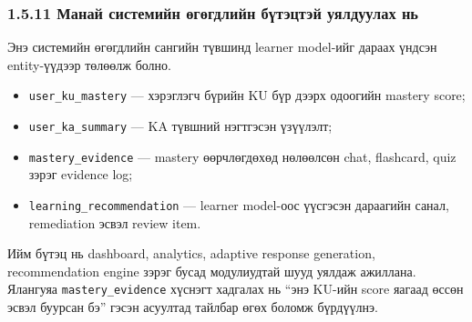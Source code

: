 \documentclass[12pt,A4]{report}
\begin{document}



\subsubsection{1.5.11 Манай системийн өгөгдлийн бүтэцтэй уялдуулах нь}

Энэ системийн өгөгдлийн сангийн түвшинд learner model-ийг дараах үндсэн entity-үүдээр төлөөлж болно.

\begin{itemize}
    \item \texttt{user\_ku\_mastery} --- хэрэглэгч бүрийн KU бүр дээрх одоогийн mastery score;
    \item \texttt{user\_ka\_summary} --- KA түвшний нэгтгэсэн үзүүлэлт;
    \item \texttt{mastery\_evidence} --- mastery өөрчлөгдөхөд нөлөөлсөн chat, flashcard, quiz зэрэг evidence log;
    \item \texttt{learning\_recommendation} --- learner model-оос үүсгэсэн дараагийн санал, remediation эсвэл review item.
\end{itemize}

Ийм бүтэц нь dashboard, analytics, adaptive response generation, recommendation engine зэрэг бусад модулиудтай шууд уялдаж ажиллана. Ялангуяа \texttt{mastery\_evidence} хүснэгт хадгалах нь ``энэ KU-ийн score яагаад өссөн эсвэл буурсан бэ'' гэсэн асуултад тайлбар өгөх боломж бүрдүүлнэ.
\end{document}
